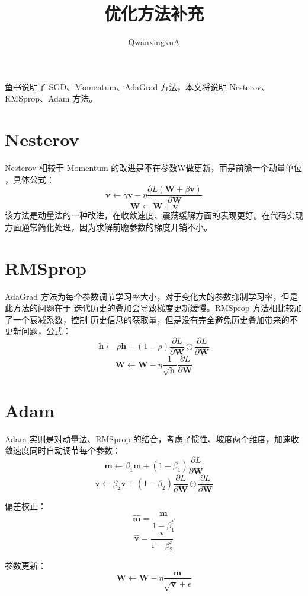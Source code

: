\documentclass {article}
\title {优化方法补充}
\author {QwanxingxuA}
\begin{document}
\maketitle
鱼书说明了 SGD、Momentum、AdaGrad 方法，本文将说明 Nesterov、RMSprop、Adam
方法。
\section {Nesterov}
Nesterov 相较于 Momentum 的改进是不在参数W做更新，而是前瞻一个动量单位
，具体公式：
\[\boldsymbol{v}\leftarrow \gamma  \boldsymbol{v} -\eta \frac{\partial L(\boldsymbol{W}+\beta \boldsymbol{v})}{\partial \boldsymbol{W}}\]
\[\boldsymbol{W}\leftarrow \boldsymbol{W} + \boldsymbol{v}\]
该方法是动量法的一种改进，在收敛速度、震荡缓解方面的表现更好。在代码实现方面通常简化处理，因为求解前瞻参数的梯度开销不小。
\section {RMSprop}
AdaGrad 方法为每个参数调节学习率大小，对于变化大的参数抑制学习率，但是此方法的问题在于
迭代历史的叠加会导致梯度更新缓慢。RMSprop 方法相比较加了一个衰减系数，控制
历史信息的获取量，但是没有完全避免历史叠加带来的不更新问题，公式：
\[\boldsymbol{h} \leftarrow \rho \boldsymbol{h} + (1-\rho)\frac{\partial L}{\partial \boldsymbol{W}} \odot \frac{\partial L}{\partial \boldsymbol{W}}\]
\[\boldsymbol{W} \leftarrow \boldsymbol{W} - \eta \frac{1}{\sqrt{\boldsymbol{h}}}\frac{\partial L}{\partial \boldsymbol{W}}\]
\section {Adam}
Adam 实则是对动量法、RMSprop 的结合，考虑了惯性、坡度两个维度，加速收敛速度同时自动调节每个参数：
\[\boldsymbol{m} \leftarrow \beta_1 \boldsymbol{m}+(1-\beta_1)\frac{\partial L}{\partial \boldsymbol{W}}\]
\[\boldsymbol{v} \leftarrow \beta_2 \boldsymbol{v}+(1-\beta_2)\frac{\partial L}{\partial \boldsymbol{W}} \odot \frac{\partial L}{\partial \boldsymbol{W}}\]

偏差校正：
\[\widehat{\boldsymbol{m}} = \frac{\boldsymbol{m}}{1-\beta_1^t}\]
\[\widehat{\boldsymbol{v}} = \frac{\boldsymbol{v}}{1-\beta_2^t}\]

参数更新：
\[\boldsymbol{W} \leftarrow \boldsymbol{W}-\eta \frac{\boldsymbol{m}}{\sqrt{\boldsymbol{v}}+\epsilon }\]
\end{document}
